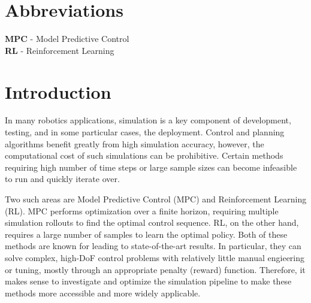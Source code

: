 \documentclass[a4paper,12pt]{article}
\begin{document}
\frontMatter


\section*{Abbreviations}
\label{sec:abbreviations}

\textbf{MPC} - Model Predictive Control \\ 
\textbf{RL} - Reinforcement Learning


\clearpage
\pagestyle{fancy}


\tableofcontents %


\clearpage

\section{Introduction}
\label{sec:introduction}

In many robotics applications, simulation is a key component of development, testing, and in some particular cases, the deployment. Control and planning algorithms benefit greatly from high simulation accuracy, however, the computational cost of such simulations can be prohibitive. Certain methods requiring high number of time steps or large sample sizes can become infeasible to run and quickly iterate over. 

Two such areas are Model Predictive Control (MPC) and Reinforcement Learning (RL). MPC performs optimization over a finite horizon, requiring multiple simulation rollouts to find the optimal control sequence. RL, on the other hand, requires a large number of samples to learn the optimal policy. Both of these methods are known for leading to state-of-the-art results. In particular, they can solve complex, high-DoF control problems with relatively little manual engieering or tuning, mostly through an appropriate penalty (reward) function. Therefore, it makes sense to investigate and optimize the simulation pipeline to make these methods more accessible and more widely applicable.
\end{document}
